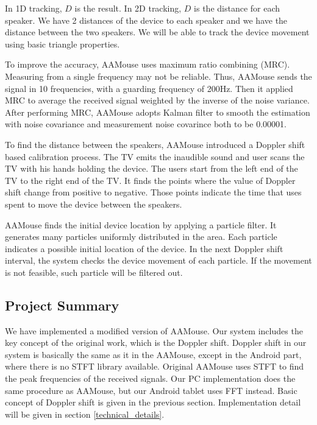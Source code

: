 \documentclass{acm_proc_article-sp}
\begin{document}
In 1D tracking, \begin{math} D \end{math} is the result. In 2D
tracking, \begin{math} D \end{math} is the distance for each
speaker. We have 2 distances of the device to each speaker and
we have the distance between the two speakers. We will be able to
track the device movement using basic triangle properties. 

To improve the accuracy, AAMouse uses maximum ratio combining (MRC). 
Measuring from a single frequency may not be reliable. Thus, AAMouse
sends the signal in 10 frequencies, with a guarding frequency of 
200Hz. Then it applied MRC to average the received signal weighted
by the inverse of the noise variance. After performing MRC,
AAMouse adopts Kalman filter to smooth the estimation with noise
covariance and measurement noise covarince both to be 0.00001.

To find the distance between the speakers, AAMouse introduced a 
Doppler shift based calibration process. 
The TV emits the inaudible sound and user scans the TV with his hands
holding the device. The users start from the left end of the TV to the
right end of the TV.
It finds the points where the 
value of Doppler shift change from positive to negative. Those points
indicate the time that uses spent to move the device between the
speakers. 

AAMouse finds the initial device location by applying a particle 
filter. It generates many particles uniformly distributed in the 
area. Each particle indicates a possible initial location of the
device. In the next Doppler shift interval, the system checks the 
device movement of each particle. If the movement is not feasible,
such particle will be filtered out.

\subsection{Project Summary}
We have implemented a modified version of AAMouse. Our system includes the key concept
of the original work, which is the Doppler shift. Doppler shift in our system is 
basically the same as it in the AAMouse, except in the Android part, where there is no
STFT library available. Original AAMouse uses STFT to find the peak frequencies of the
received signals. Our PC implementation does the same procedure as AAMouse, but our 
Android tablet uses FFT instead. Basic concept of Doppler shift is given in the previous 
section. Implementation detail will be given in section \ref{technical_details}.
\end{document}

